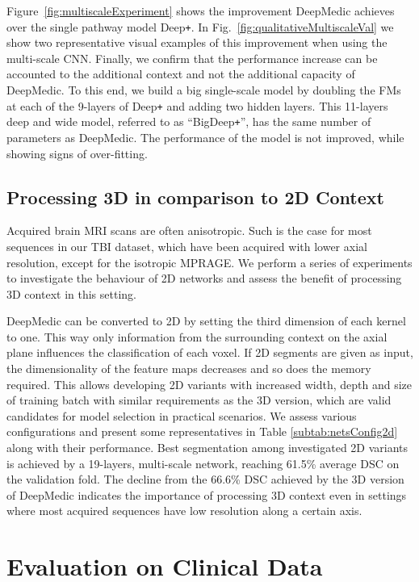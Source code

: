 \documentclass[preprint,authoryear,12pt]{elsarticle}
\newcommand{\quot}[1]{``#1''}
\begin{document}
Figure~\ref{fig:multiscaleExperiment} shows the improvement DeepMedic achieves over the single pathway model Deep\texttt{+}. In Fig.~\ref{fig:qualitativeMultiscaleVal} we show two representative visual examples of this improvement when using the multi-scale CNN. Finally, we confirm that the performance increase can be accounted to the additional context and not the additional capacity of DeepMedic. To this end, we build a big single-scale model by doubling the FMs at each of the 9-layers of Deep\texttt{+} and adding two hidden layers. This 11-layers deep and wide model, referred to as \quot{BigDeep\texttt{+}}, has the same number of parameters as DeepMedic. The performance of the model is not improved, while showing signs of over-fitting.

\subsection{Processing 3D in comparison to 2D Context}
\label{subsec:val3dContext}

Acquired brain MRI scans are often anisotropic. Such is the case for most sequences in our TBI dataset, which have been acquired with lower axial resolution, except for the isotropic MPRAGE. We perform a series of experiments to investigate the behaviour of 2D networks and assess the benefit of processing 3D context in this setting.

DeepMedic can be converted to 2D by setting the third dimension of each kernel to one. This way only information from the surrounding context on the axial plane influences the classification of each voxel. If 2D segments are given as input, the dimensionality of the feature maps decreases and so does the memory required. This allows developing 2D variants with increased width, depth and size of training batch with similar requirements as the 3D version, which are valid candidates for model selection in practical scenarios. We assess various configurations and present some representatives in Table \ref{subtab:netsConfig2d} along with their performance. Best segmentation among investigated 2D variants is achieved by a 19-layers, multi-scale network, reaching 61.5\% average DSC on the validation fold. The decline from the 66.6\% DSC achieved by the 3D version of DeepMedic indicates the importance of processing 3D context even in settings where most acquired sequences have low resolution along a certain axis.
 





\section{Evaluation on Clinical Data}
\label{sec:evaluation}
\end{document}
